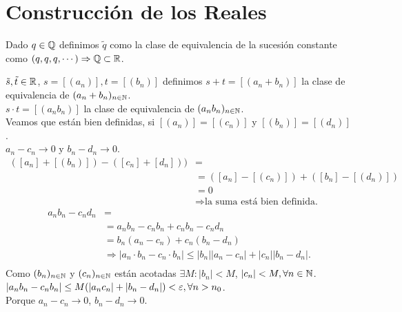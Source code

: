 \section{Construcción de los Reales}

\begin{note}
  Dado $q \in \mathbb{Q}$ definimos $\tilde{q}$ como la clase de equivalencia de la sucesión constante como $(q, q, q, \cdots) \Rightarrow \mathbb{Q} \subset \mathbb{R}$.
\end{note}

\begin{definition}
  $\tilde{s}, \tilde{t} \in \mathbb{R}$, $s = [(a_n)], t = [(b_n)]$ definimos $s+t = [(a_n + b_n)]$ la clase de equivalencia de $(a_n + b_n)_{n \in \mathbb{N}}$. \\
  $s \cdot t = [(a_n b_n)]$ la clase de equivalencia de $(a_n b_n)_{n \in \mathbb{N}}$. \\
  Veamos que están bien definidas, si $[(a_n)] = [(c_n)]$ y $[(b_n)] = [(d_n)]$. \\
  $a_n - c_n \to 0$ y $b_n - d_n \to 0$. \\
  \begin{align*}
    ([a_n] + [(b_n)]) - ([c_n] +[d_n])) & =                                              \\
                                        & = ([a_n] - [(c_n)]) + ([b_n] - [(d_n)])        \\
                                        & = 0                                            \\
                                        & \Rightarrow \text{la suma está bien definida.}
  \end{align*}
  \begin{align*}
    a_n b_n - c_n d_n & =                                                                                       \\
                      & = a_n b_n - c_n b_n + c_n b_n - c_n d_n                                                 \\
                      & = b_n (a_n - c_n) + c_n (b_n - d_n)                                                     \\
                      & \Rightarrow |a_n \cdot b_n - c_n \cdot b_n| \leq |b_n| |a_n - c_n| + |c_n| |b_n - d_n|. \\
  \end{align*}
  Como $(b_n)_{n \in \mathbb{N}}$ y $(c_n)_{n \in \mathbb{N}}$ están acotadas $\exists M : |b_n| < M$, $|c_n| < M, \forall n \in \mathbb{N}$. \\
  $|a_n b_n - c_n b_n| \leq M (|a_n c_n| + |b_n - d_n|) < \varepsilon, \forall n > n_0$. \\
  Porque $a_n - c_n \to 0$, $b_n - d_n \to 0$.
\end{definition}

